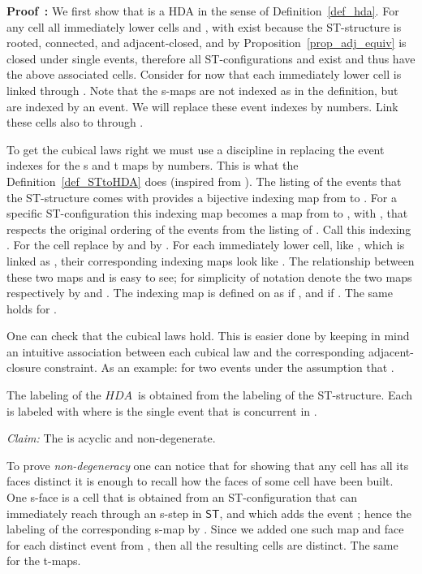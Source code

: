 \documentclass[submission,copyright,creativecommons]{eptcs}
\newenvironment{proof}[1][\!\!\,]{\vspace{1ex}\noindent\textbf{Proof #1: }}{\hfill\vspace{2ex}}
\newcommand\HDA{\ensuremath{\mathit{HDA}}}
\newcommand\ST{\ensuremath{\mathsf{ST}}}
\begin{document}
\begin{proof}
We first show that  is a HDA in the sense of Definition~\ref{def_hda}.
For any cell  all immediately lower cells  and , with  exist because the ST-structure is rooted, connected, and adjacent-closed, and by Proposition~\ref{prop_adj_equiv} is closed under single events, therefore all ST-configurations  and  exist and thus have the above associated cells. 
Consider for now that each immediately lower cell  is linked through . Note that the s-maps are not indexed as in the definition, but are indexed by an event. We will replace these event indexes by numbers. Link these cells also to  through . 

To get the cubical laws right we must use a discipline in replacing the event indexes for the s and t maps by numbers. This is what the Definition~\ref{def_STtoHDA} does (inspired from \cite{Glabbeek06HDA}). 
The listing of the events that the ST-structure comes with provides a bijective indexing map  from  to . For a specific ST-configuration  this indexing map becomes a map from  to , with , that respects the original ordering of the events from the listing of . Call this indexing .
For the cell  replace  by  and  by . For each immediately lower cell, like , which is linked as , their corresponding indexing maps look like .
The relationship between these two maps  and  is easy to see; for simplicity of notation denote the two maps respectively by  and . The indexing map  is defined on  as  if , and  if .  The same holds for .

One can check that the cubical laws hold. This is easier done by keeping in mind an intuitive association between each cubical law and the corresponding adjacent-closure constraint.
As an example:  for two events  under the assumption that .

The labeling of the \HDA\ is obtained from the labeling of the ST-structure. Each  is labeled with  where  is the single event that is concurrent in .

\vspace{1ex}
\noindent\textit{Claim:}\hspace{1ex} The  is acyclic and non-degenerate.
\vspace{0.5ex}

To prove \textit{non-degeneracy} one can notice that for showing that any cell has all its faces distinct it is enough to recall how the faces of some cell  have been built. One s-face is a cell  that is obtained from an ST-configuration that can immediately reach  through an s-step in \ST, and which adds the event ; hence the labeling of the corresponding s-map by . Since we added one such map and face for each distinct event from , then all the resulting cells are distinct. The same for the t-maps.


\end{proof}
\end{document}

